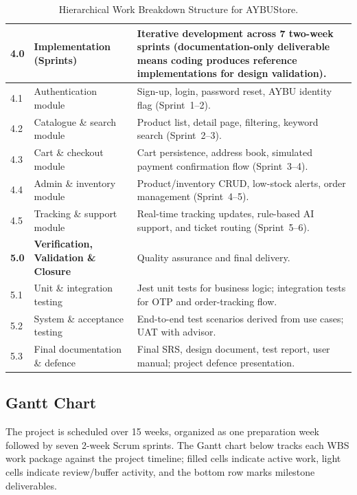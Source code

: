 \documentclass[11pt,a4paper]{article}
\begin{document}
\begin{table}[H]
\begin{tabular}{|p{}|p{}|p{}|}
\rowcolor{aybuBlock}
\textbf{4.0} & \textbf{Implementation (Sprints)} & Iterative
development across 7 two-week sprints (documentation-only deliverable
means coding produces reference implementations for design
validation). \\ \hline
4.1 & Authentication module & Sign-up, login, password reset, AYBU
identity flag (Sprint~1--2). \\ \hline
4.2 & Catalogue \& search module & Product list, detail page,
filtering, keyword search (Sprint~2--3). \\ \hline
4.3 & Cart \& checkout module & Cart persistence, address book,
simulated payment confirmation flow (Sprint~3--4). \\ \hline
4.4 & Admin \& inventory module & Product/inventory CRUD, low-stock
alerts, order management (Sprint~4--5). \\ \hline
4.5 & Tracking \& support module & Real-time tracking updates,
rule-based AI support, and ticket routing (Sprint~5--6). \\ \hline
 
\rowcolor{aybuBlock}
\textbf{5.0} & \textbf{Verification, Validation \& Closure} & Quality
assurance and final delivery. \\ \hline
5.1 & Unit \& integration testing & Jest unit tests for business
logic; integration tests for OTP and order-tracking flow. \\ \hline
5.2 & System \& acceptance testing & End-to-end test scenarios derived
from use cases; UAT with advisor. \\ \hline
5.3 & Final documentation \& defence & Final SRS, design document,
test report, user manual; project defence presentation. \\ \hline
\end{tabular}
\caption{Hierarchical Work Breakdown Structure for AYBUStore.}
\label{tab:wbs}
\end{table}
 
\subsection{Gantt Chart}
\label{subsec:gantt}
The project is scheduled over 15 weeks, organized as one preparation
week followed by seven 2-week Scrum sprints. The Gantt chart below
tracks each WBS work package against the project timeline; filled
cells indicate active work, light cells indicate review/buffer
activity, and the bottom row marks milestone deliverables.
 
\end{document}
